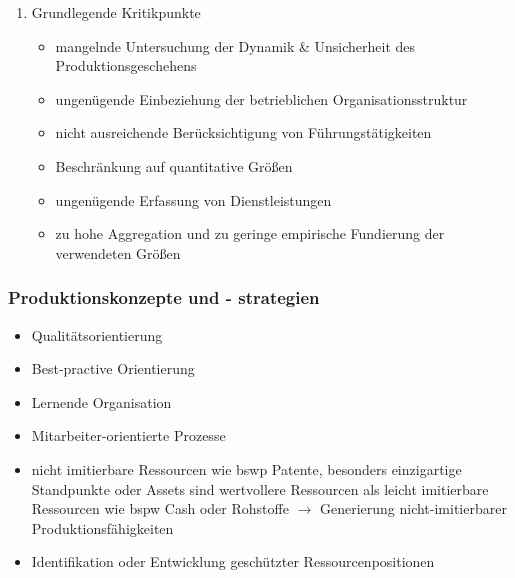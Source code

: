 \documentclass[11pt]{article}
\begin{document}
\begin{enumerate}
\item Grundlegende Kritikpunkte
\label{sec:org29e24ba}
\begin{itemize}
\item mangelnde Untersuchung der Dynamik \& Unsicherheit des Produktionsgeschehens
\item ungenügende Einbeziehung der betrieblichen Organisationsstruktur
\item nicht ausreichende Berücksichtigung von Führungstätigkeiten
\item Beschränkung auf quantitative Größen
\item ungenügende Erfassung von Dienstleistungen
\item zu hohe Aggregation und zu geringe empirische Fundierung der verwendeten Größen
\end{itemize}
\end{enumerate}

\subsubsection{Produktionskonzepte und - strategien}
\label{sec:orgc1f9a2c}
\begin{itemize}
\item Qualitätsorientierung
\item Best-practive Orientierung
\item Lernende Organisation
\item Mitarbeiter-orientierte Prozesse
\item nicht imitierbare Ressourcen wie bswp Patente, besonders einzigartige Standpunkte oder Assets sind wertvollere Ressourcen als leicht imitierbare Ressourcen wie bspw Cash oder Rohstoffe \(\rightarrow\) Generierung nicht-imitierbarer Produktionsfähigkeiten
\item Identifikation oder Entwicklung geschützter Ressourcenpositionen
\end{itemize}
\end{document}
